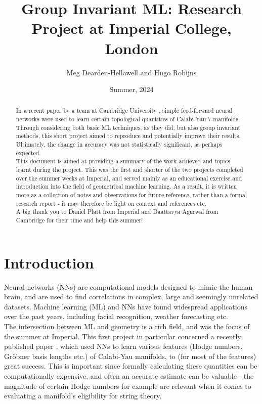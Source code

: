 \documentclass{article}
\title{Group Invariant ML: Research Project at Imperial College, London}
\author{Meg Dearden-Hellawell and Hugo Robijns}
\date{Summer, 2024}
\begin{document}
\maketitle

\begin{abstract}
\noindent In a recent paper by a team at Cambridge University \cite{Aggarwal}, simple feed-forward neural networks were used to learn certain topological quantities of Calabi-Yau 7-manifolds. Through considering both basic ML techniques, as they did, but also group invariant methods, this short project aimed to reproduce and potentially improve their results. Ultimately, the change in accuracy was not statistically significant, as perhaps expected.\\

\noindent This document is aimed at providing a summary of the work achieved and topics learnt during the project. This was the first and shorter of the two projects completed over the summer weeks at Imperial, and served mainly as an educational exercise and introduction into the field of geometrical machine learning. As a result, it is written more as a collection of notes and observations for future reference, rather than a formal research report - it may therefore be light on context and references etc. \\

\noindent A big thank you to Daniel Platt from Imperial and Daattavya Agarwal from Cambridge for their time and help this summer!

\end{abstract}

\newpage

\section{Introduction}
Neural networks (NNs) are computational models designed to mimic the human brain, and are used to find correlations in complex, large and seemingly unrelated datasets. Machine learning (ML) and NNs have found widespread applications over the past years, including facial recognition, weather forecasting etc. \\

The intersection between ML and geometry is a rich field, and was the focus of the summer at Imperial. This first project in particular concerned a recently published paper \cite{Aggarwal}, which used NNs to learn various features (Hodge numbers, Gröbner basis lengths etc.) of Calabi-Yau manifolds, to (for most of the features) great success. This is important since formally calculating these quantities can be computationally expensive, and often an accurate estimate can be valuable - the magnitude of certain Hodge numbers for example are relevant when it comes to evaluating a manifold's eligibility for string theory. \\
\end{document}
